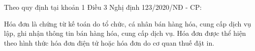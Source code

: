 Theo quy định tại khoản 1 Điều 3 Nghị định 123/2020/NĐ - CP:

Hóa đơn là chứng từ kế toán do tổ chức, cá nhân bán hàng hóa, cung cấp dịch vụ lập, ghi nhận thông tin bán hàng hóa, cung cấp dịch vụ. Hóa đơn được thể hiện theo hình thức hóa đơn điện tử hoặc hóa đơn do cơ quan thuế đặt in.